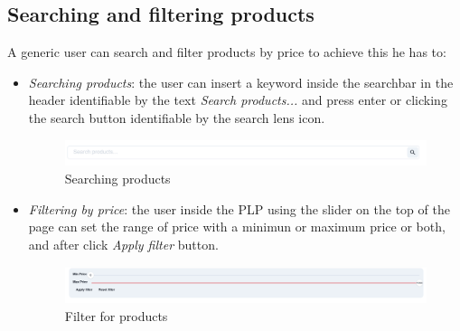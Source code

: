 \subsection{Searching and filtering products}
A generic user can search and filter products by price to achieve this he has to:
\begin{itemize}
    \item  \textit{Searching products}: the user can insert a keyword inside the searchbar in the header identifiable by the text \textit{Search products...} and press enter or clicking the search button identifiable by the search lens icon.
          \begin{figure}[!ht]
              \caption{Searching products}
              \vspace{10px}
              \includegraphics[scale=0.2]{../../../../Images/userManual/searcbar.png}
              \centering
          \end{figure}
    \item \textit{Filtering by price}: the user inside the PLP using the slider on the top of the page can set the range of price with a minimun or maximum price or both, and after click \textit{Apply filter} button.
          \begin{figure}[!ht]
              \caption{Filter for products}
              \vspace{10px}
              \includegraphics[scale=0.2]{../../../../Images/userManual/filter.png}
              \centering
          \end{figure}
\end{itemize}
